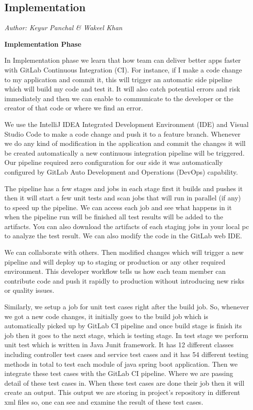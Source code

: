 

\subsection{Implementation}\label{sec:Implementation}

\textit{Author: Keyur Panchal \& Wakeel Khan}

\textbf{Implementation Phase}

In Implementation phase we learn that how team can deliver better apps faster with GitLab Continuous Integration (CI). For instance, if I make a code change to my application and commit it, this will trigger an automatic side pipeline which will build my code and test it. It will also catch potential errors and risk immediately and then we can enable to
communicate to the developer or the creator of that code or where we find an error.

We use the IntelliJ IDEA Integrated Development Environment (IDE) and Visual Studio Code to make a code change and push it to a feature branch. Whenever we do any kind of modification in the application and commit the changes it will be created automatically a new continuous integration pipeline will be triggered. Our pipeline required zero configuration for our side it was automatically configured by GitLab Auto Development and Operations (DevOps) capability.

The pipeline has a few stages and jobs in each stage first it builds and pushes it then it will start a few unit tests and scan jobs that will run in parallel (if any) to speed up the pipeline. We can access each job and see what happens in it when the pipeline run will be finished all test results will be added to the artifacts. You can also download the artifacts of each staging jobs in your local pc to analyze the test result. We can also modify the code in the GitLab web IDE.

We can collaborate with others. Then modified changes which will trigger a new pipeline and will deploy up to staging or production or any other required environment. This developer workflow tells us how each team member can contribute code and push it rapidly to production without introducing new risks or quality issues.

Similarly, we setup a job for unit test cases right after the build job. So, whenever we got a new code changes, it initially goes to the build job which is automatically picked up by GitLab CI pipeline and once build stage is finish its job then it goes to the next stage, which is testing stage. In test stage we perform unit test which is written in Java Junit framework. It has 12 different classes including controller test cases and service test cases and it has 54 different testing methods in total to test each module of java spring boot application. Then we integrate these test cases with the GitLab CI pipeline. Where we are passing detail of these test cases in. When these test cases are done their job then it will create an output. This output we are storing in project's repository in different xml files so, one can see and examine the result of these test cases.

